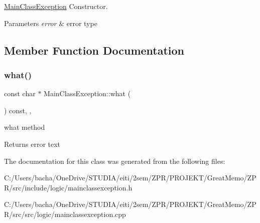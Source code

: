 \hyperlink{class_main_class_exception}{Main\+Class\+Exception} Constructor. 


\begin{DoxyParams}{Parameters}
{\em error} & error type \\
\hline
\end{DoxyParams}


\subsection{Member Function Documentation}
\mbox{\label{class_main_class_exception_afb4018ca88fb02af701a0d07e4553d19}} 
\subsubsection{\texorpdfstring{what()}{what()}}
{\footnotesize\ttfamily const char $\ast$ Main\+Class\+Exception\+::what (\begin{DoxyParamCaption}{ }\end{DoxyParamCaption}) const\hspace{0.3cm}{\ttfamily [override]}, {\ttfamily [virtual]}, {\ttfamily [noexcept]}}



what method 

\begin{DoxyReturn}{Returns}
error text 
\end{DoxyReturn}


The documentation for this class was generated from the following files\+:\begin{DoxyCompactItemize}
\item 
C\+:/\+Users/bacha/\+One\+Drive/\+S\+T\+U\+D\+I\+A/eiti/2sem/\+Z\+P\+R/\+P\+R\+O\+J\+E\+K\+T/\+Great\+Memo/\+Z\+P\+R/src/include/logic/mainclassexception.\+h\item 
C\+:/\+Users/bacha/\+One\+Drive/\+S\+T\+U\+D\+I\+A/eiti/2sem/\+Z\+P\+R/\+P\+R\+O\+J\+E\+K\+T/\+Great\+Memo/\+Z\+P\+R/src/src/logic/mainclassexception.\+cpp\end{DoxyCompactItemize}
